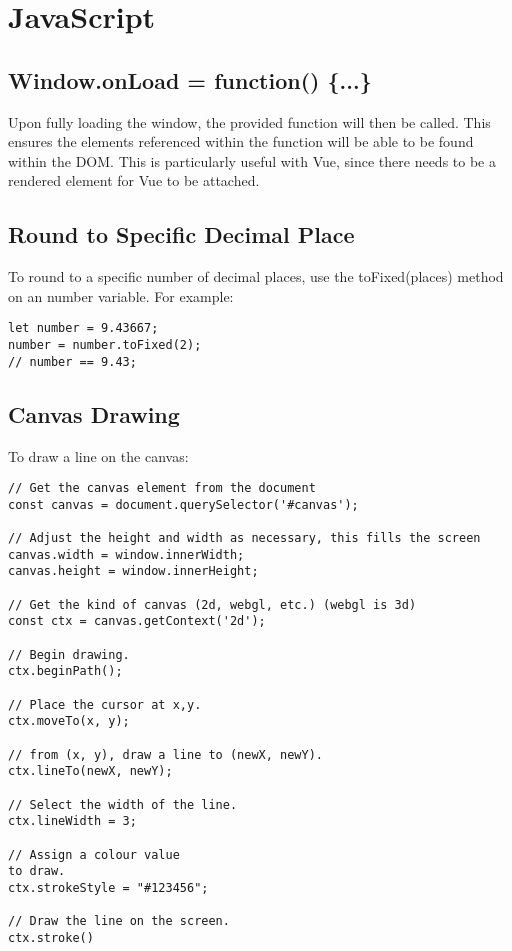 \documentclass[portfolio.tex]{subfiles}
\begin{document}
		\section{JavaScript}
			\subsection[Window.onLoad]{Window.onLoad = function() \{...\}}
				\label{js-window-onload}
				Upon fully loading the window, the provided function will then be called. This ensures the elements referenced within the function will be able to be found within the DOM. This is particularly useful with Vue, since there needs to be a rendered element for Vue to be attached. \autocite{onload}
			\subsection{Round to Specific Decimal Place}
				\label{js-round-number}
				To round  to a specific number of decimal places, use the toFixed(places) method on an number variable. For example:\\

				\begin{lstlisting}
let number = 9.43667;
number = number.toFixed(2);
// number == 9.43;
				\end{lstlisting}
			\autocite{tofixed}

		\subsection{Canvas Drawing}
			\label{js-canvas}
			To draw a line on the canvas:

			\begin{lstlisting}
// Get the canvas element from the document
const canvas = document.querySelector('#canvas');

// Adjust the height and width as necessary, this fills the screen
canvas.width = window.innerWidth;
canvas.height = window.innerHeight;

// Get the kind of canvas (2d, webgl, etc.) (webgl is 3d)
const ctx = canvas.getContext('2d');

// Begin drawing.
ctx.beginPath();

// Place the cursor at x,y.
ctx.moveTo(x, y);

// from (x, y), draw a line to (newX, newY).
ctx.lineTo(newX, newY);

// Select the width of the line.
ctx.lineWidth = 3;

// Assign a colour value
to draw.
ctx.strokeStyle = "#123456";

// Draw the line on the screen.
ctx.stroke()

			\end{lstlisting}
\end{document}
